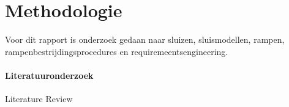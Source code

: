 \graphicspath{{2_Body/Figures/}}




\chapter{Methodologie}
\label{chapter:body}
\thispagestyle{myheadings}
Voor dit rapport is onderzoek gedaan naar sluizen, sluismodellen, rampen, rampenbestrijdingsprocedures en requiremeentsengineering.

\subsubsection{Literatuuronderzoek}
\begin{frame}{Literature Review}
	\begin{table}[htbp]
		\footnotesize
		

\end{table}
\end{frame}
